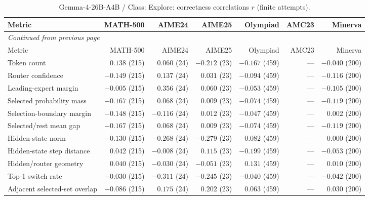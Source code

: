 \begingroup\scriptsize\setlength{\tabcolsep}{4pt}
\begin{longtable}{@{}lrrrrrr@{}}
\caption{Gemma-4-26B-A4B / Class: Explore: correctness correlations $r$ (finite attempts).}\label{tab:multi-gemma-class-Explore}\\
\toprule
Metric & MATH-500 & AIME24 & AIME25 & Olympiad & AMC23 & Minerva \\
\midrule\endfirsthead
\multicolumn{7}{l}{\textit{Continued from previous page}}\\
\toprule
Metric & MATH-500 & AIME24 & AIME25 & Olympiad & AMC23 & Minerva \\
\midrule\endhead
\bottomrule\endfoot
Token count & $0.138$ (215) & $0.060$ (24) & $-0.212$ (23) & $-0.167$ (459) & --- & $-0.040$ (200) \\
Router confidence & $-0.149$ (215) & $0.137$ (24) & $0.031$ (23) & $-0.094$ (459) & --- & $-0.116$ (200) \\
Leading-expert margin & $-0.005$ (215) & $0.356$ (24) & $0.060$ (23) & $-0.053$ (459) & --- & $-0.105$ (200) \\
Selected probability mass & $-0.167$ (215) & $0.068$ (24) & $0.009$ (23) & $-0.074$ (459) & --- & $-0.119$ (200) \\
Selection-boundary margin & $-0.148$ (215) & $-0.116$ (24) & $0.012$ (23) & $-0.047$ (459) & --- & $0.002$ (200) \\
Selected/rest mean gap & $-0.167$ (215) & $0.068$ (24) & $0.009$ (23) & $-0.074$ (459) & --- & $-0.119$ (200) \\
Hidden-state norm & $-0.130$ (215) & $-0.268$ (24) & $-0.279$ (23) & $0.082$ (459) & --- & $0.000$ (200) \\
Hidden-state step distance & $0.042$ (215) & $-0.008$ (24) & $0.115$ (23) & $-0.199$ (459) & --- & $-0.053$ (200) \\
Hidden/router geometry & $0.040$ (215) & $-0.030$ (24) & $-0.051$ (23) & $0.131$ (459) & --- & $0.010$ (200) \\
Top-1 switch rate & $-0.030$ (215) & $-0.311$ (24) & $-0.245$ (23) & $-0.040$ (459) & --- & $-0.042$ (200) \\
Adjacent selected-set overlap & $-0.086$ (215) & $0.175$ (24) & $0.202$ (23) & $0.063$ (459) & --- & $0.030$ (200) \\
\end{longtable}\endgroup

